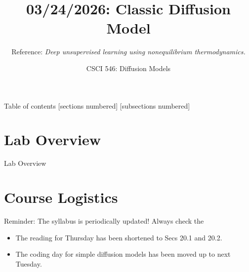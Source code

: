 \documentclass[10pt]{beamer}
\title{03/24/2026: Classic Diffusion Model}
\author{Reference: \textit{Deep unsupervised learning using nonequilibrium thermodynamics.}}
\date{CSCI 546: Diffusion Models}
\begin{document}
\maketitle


\begin{frame}{Table of contents}
  [sections numbered]
  [subsections numbered]
  \tableofcontents
\end{frame}


\section{Lab Overview}

\begin{frame}[standout]
Lab Overview
\end{frame}


\section{Course Logistics}



\begin{frame}
\begin{myredbox}[title=Announcements on syllabus]
Reminder: The syllabus is periodically updated! Always check the 
\vspace{.2cm}
\begin{itemize}
	\item The reading for Thursday has been shortened to Secs 20.1 and 20.2.
	\item The coding day for simple diffusion models has been moved up to next Tuesday.
\end{itemize}
\end{myredbox}
\end{frame}
\end{document}
